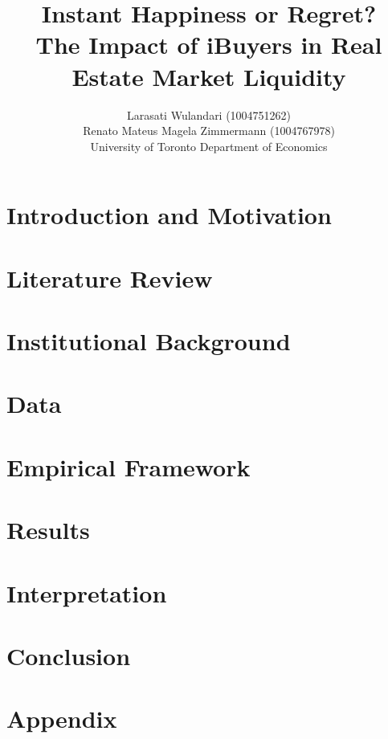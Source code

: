\documentclass{article}
\title{Instant Happiness or Regret? \\
\Large The Impact of iBuyers in Real Estate Market Liquidity \\
}
\author{
    Larasati Wulandari (1004751262) \\
    Renato Mateus Magela Zimmermann (1004767978)    \\
    University of Toronto Department of Economics
}
\begin{document}
\doublespacing

\begin{minipage}[h]{\textwidth}

    \maketitle

    

\end{minipage}

\twocolumn

\section{Introduction and Motivation}



\section{Literature Review}



\section{Institutional Background}



\section{Data}



\section{Empirical Framework}\label{empirical_framework}



\section{Results}



\section{Interpretation}



\section{Conclusion}



\medskip



\pagebreak
\onecolumn

\section{Appendix}


\end{document}
